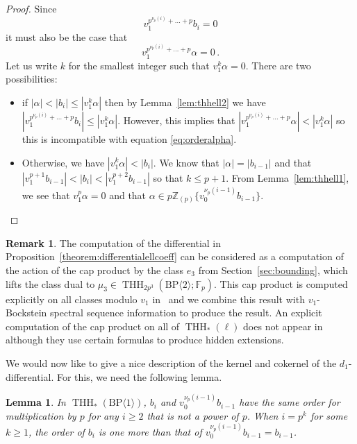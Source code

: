 \documentclass[11pt]{amsart}
\newcommand{\mr}[1]{\mathrm{#1}}
\newcommand{\Z}{\mathbb{Z}}
\newcommand{\BP}{\mr{BP}}
\DeclareMathOperator{\THH}{THH}
\newtheorem{lemma}[equation]{Lemma}
\theoremstyle{definition}
\newtheorem{remark}[equation]{Remark}
\numberwithin{equation}{section}
\numberwithin{figure}{section}
\begin{document}
\begin{proof}
  Since
  \[
    v_1^{p^{\nu_p(i)} + \dots + p } b_i = 0
  \]
  it must also be the case that
  \begin{equation} \label{eq:orderalpha}
    v_1^{p^{\nu_p(i)} + \dots + p } \alpha = 0 \,.
  \end{equation}
  Let us write $k$ for the smallest integer such that $v_1^k \alpha = 0$. There are two possibilities:
  \begin{itemize}
  \item if $ |\alpha| < |b_i| \leq |v_1^k \alpha|$ then by Lemma~\ref{lem:thhell2} we have $|v_1^{p^{\nu_p(i)} + \dots + p } b_i| \leq |v_1^k \alpha|$. However, this implies that $|v_1^{p^{\nu_p(i)} + \dots + p } \alpha | < |v_1^k \alpha|$ so this is incompatible with equation \eqref{eq:orderalpha}.
  \item Otherwise, we have $|v_1^k \alpha | < |b_i|$. We know that $|\alpha | = |b_{i-1}|$ and that $|v_1^{p+1} b_{i-1}| < |b_i| < |v_1^{p+2} b_{i-1}|$ so that $k \leq p +1$. From Lemma~\ref{lem:thhell1}, we see that $v_1^p\alpha = 0$ and that $\alpha \in p\Z_{(p)}\{ v_0^{\nu_p(i-1)}b_{i-1} \}$.
  \end{itemize}
\end{proof}

\begin{remark}
The computation of the differential in Proposition~\ref{theorem:differentialellcoeff} can be considered as a computation of the action of the cap product by the class $e_{3}$ from Section~\ref{sec:bounding}, which lifts the class dual to $\mu_3\in \THH_{2p^3}(\BP\langle 2\rangle;\mathbb{F}_p)$. This cap product is computed explicitly on all classes modulo $v_1$ in~\cite[Corollary~5.7]{AHL10} and we combine this result with $v_1$-Bockstein spectral sequence information to produce the result. An explicit computation of the cap product on all of $\THH_*(\ell)$ does not appear in~\cite{AHL09} although they use certain formulas to produce hidden extensions. 
\end{remark}

We would now like to give a nice description of the kernel and cokernel of the $d_1$-differential. For this, we need the following lemma. 

\begin{lemma} \label{lem:thhell3}
  In $\THH_*(\BP\langle 1\rangle)$, $b_i$ and $v_0^{\nu_p(i-1)} b_{i-1}$ have the same order for multiplication by $p$ for any $ i \geq 2$ that is not a power of $p$. When $i = p^k$ for some $k \geq 1$, the order of $b_i$ is one more than that of $v_0^{\nu_p(i-1)} b_{i-1} = b_{i-1}$.
\end{lemma}
\end{document}
